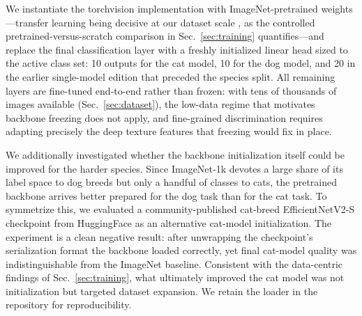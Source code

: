 We instantiate the torchvision implementation with ImageNet-pretrained
weights---transfer learning being decisive at our dataset scale
\cite{kornblith2019transfer}, as the controlled pretrained-versus-scratch
comparison in Sec.~\ref{sec:training} quantifies---and replace the final
classification layer with a freshly initialized linear head sized to the
active class set: 10 outputs for the cat model, 10 for the dog model, and 20
in the earlier single-model edition that preceded the species split. All remaining layers are fine-tuned end-to-end rather than frozen: with tens
of thousands of images available (Sec.~\ref{sec:dataset}), the low-data
regime that motivates backbone freezing does not apply, and fine-grained
discrimination requires adapting precisely the deep texture features that
freezing would fix in place.

We additionally investigated whether the backbone initialization itself could
be improved for the harder species. Since ImageNet-1k devotes a large share
of its label space to dog breeds but only a handful of classes to cats, the
pretrained backbone arrives better prepared for the dog task than for the cat
task. To symmetrize this, we evaluated a community-published cat-breed
EfficientNetV2-S checkpoint from HuggingFace as an alternative cat-model
initialization. The experiment is a clean negative result: after unwrapping
the checkpoint's serialization format the backbone loaded correctly, yet final cat-model quality was indistinguishable from the
ImageNet baseline. Consistent with the data-centric findings of
Sec.~\ref{sec:training}, what ultimately improved the cat model was not
initialization but targeted dataset expansion. We retain the loader in the
repository for reproducibility.

